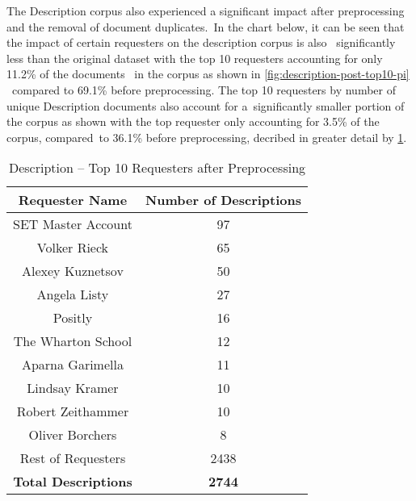 \documentclass[letterpaper,12pt]{article}
\begin{document}
\newpage

The Description corpus also experienced a significant impact after preprocessing and the removal of document duplicates.\ 
In the chart below, it can be seen that the impact of certain requesters on the description corpus is also \
significantly less than the original dataset with the top 10 requesters accounting for only 11.2\% of the documents \
in the corpus as shown in \ref{fig:description-post-top10-pi} \
compared to 69.1\% before preprocessing. The top 10 requesters by number of unique Description documents also account for a\
significantly smaller portion of the corpus as shown with the top requester only accounting for 3.5\% of the corpus, compared\
to 36.1\% before preprocessing, decribed in greater detail by \ref{tab:description_requester_top_10}.

\begin{table}
	\caption{\label{tab:description_requester_top_10} Description -- Top 10 Requesters after Preprocessing}
	\begin{center}
		\begin{tabular}{| c | c |}
				\hline
				\textbf{Requester Name} &  \textbf{Number of Descriptions} \\
				\hline
				SET Master Account &              97 \\
				\hline
				Volker Rieck       &              65 \\
				\hline
				Alexey Kuznetsov   &              50 \\
				\hline
				Angela Listy       &              27 \\
				\hline
				Positly            &              16 \\
				\hline
				The Wharton School &              12 \\
				\hline
				Aparna Garimella   &              11 \\
				\hline
				Lindsay Kramer     &              10 \\
				\hline
				Robert Zeithammer  &              10 \\
				\hline
				Oliver Borchers    &               8 \\
				\hline
				Rest of Requesters &            2438 \\
				\hline
				\textbf{Total Descriptions} &  \textbf{2744} \\
				\hline
		\end{tabular}
	\end{center}
\end{table}
\end{document}
